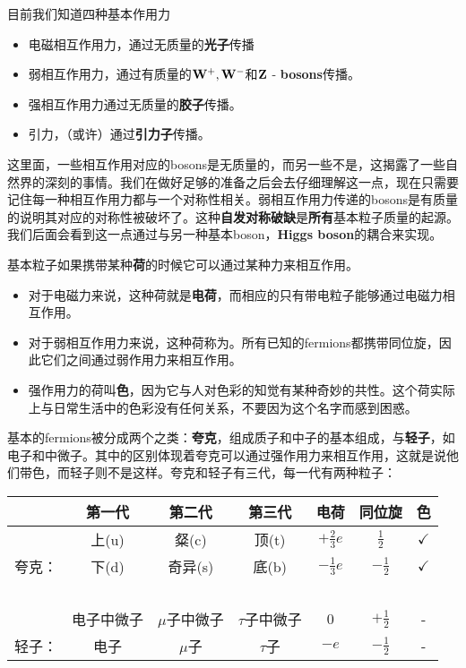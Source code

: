 目前我们知道四种基本作用力

\begin{itemize}
\item 电磁相互作用力，通过无质量的{\bf 光子}传播
\item 弱相互作用力，通过有质量的$\bf W^+, W^-$和$\bf Z$ - {\bf bosons}传播。
\item 强相互作用力通过无质量的{\bf 胶子}传播。
\item 引力，（或许）通过{\bf 引力子}传播。
\end{itemize}

这里面，一些相互作用对应的bosons是无质量的，而另一些不是，这揭露了一些自然界的深刻的事情。我们在做好足够的准备之后会去仔细理解这一点，现在只需要记住每一种相互作用力都与一个对称性相关。弱相互作用力传递的bosons是有质量的说明其对应的对称性被破坏了。这种{\bf 自发对称破缺}是{\bf 所有}基本粒子质量的起源。我们后面会看到这一点通过与另一种基本boson，{\bf Higgs boson}的耦合来实现。

基本粒子如果携带某种{\bf 荷}的时候它可以通过某种力来相互作用。

\begin{itemize}
\item 对于电磁力来说，这种荷就是{\bf 电荷}，而相应的只有带电粒子能够通过电磁力相互作用。
\item 对于弱相互作用力来说，这种荷称为。所有已知的fermions都携带同位旋，因此它们之间通过弱作用力来相互作用。
\item 强作用力的荷叫{\bf 色}，因为它与人对色彩的知觉有某种奇妙的共性。这个荷实际上与日常生活中的色彩没有任何关系，不要因为这个名字而感到困惑。
\end{itemize}

基本的fermions被分成两个之类：{\bf 夸克}，组成质子和中子的基本组成，与{\bf 轻子}，如电子和中微子。其中的区别体现着夸克可以通过强作用力来相互作用，这就是说他们带色，而轻子则不是这样。夸克和轻子有三代，每一代有两种粒子：

\begin{table}[h]
\centering
\begin{tabular}{c|c|c|c|c|c|c}
 \hline
 & 第一代 & 第二代 & 第三代 & 电荷 & 同位旋 & 色 \\
 \hline
 & 上(u)  & 粲(c) &  顶(t) & $+\tfrac{2}{3}e$  & $\tfrac{1}{2}$ & $\checkmark$\\
 夸克： & 下(d) & 奇异(s) &底(b) & $-\tfrac{1}{3}e$ & $-\tfrac{1}{2}$ & $\checkmark$\\
 \hline
 \ &\ &\ &\ &\ &\ &\ \\
 \hline
 & 电子中微子 & $\mu$子中微子 & $\tau$子中微子 & 0 & $+\tfrac{1}{2}$ & -\\
 轻子：&电子 & $\mu$子 & $\tau$子 & $-e$ & $-\tfrac{1}{2}$ & -\\
 \hline
\end{tabular}
\end{table}

